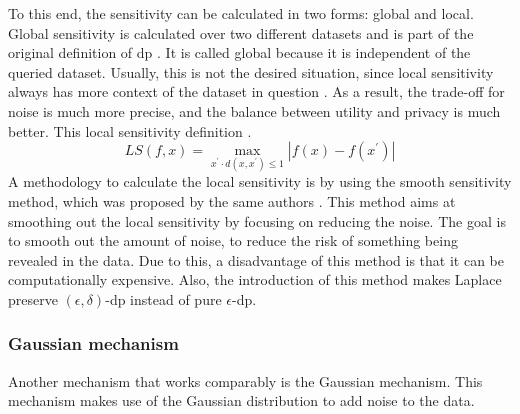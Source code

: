 To this end, the sensitivity can be calculated in two forms: global and local.
Global sensitivity is calculated over two different datasets and is part of the original definition of \gls{dp} \citep{dwork_differential_2006}.
It is called global because it is independent of the queried dataset.
Usually, this is not the desired situation, since local sensitivity always has more context of the dataset in question \citep{nissim_smooth_2007}.
As a result, the trade-off for noise is much more precise, and the balance between utility and privacy is much better.
This local sensitivity definition \citep{nissim_smooth_2007}.
\begin{equation}
  LS(f,x)=\operatorname*{max}_{x^{\prime}\cdot d(x,x^{\prime})\leq1}|f(x)-f(x^{\prime})|
  \label{local-sensitivity}
\end{equation}
A methodology to calculate the local sensitivity is by using the smooth sensitivity method, which was proposed by the same authors \citep{nissim_smooth_2007}.
This method aims at smoothing out the local sensitivity by focusing on reducing the noise.
The goal is to smooth out the amount of noise, to reduce the risk of something being revealed in the data.
Due to this, a disadvantage of this method is that it can be computationally expensive.
Also, the introduction of this method makes Laplace preserve $(\epsilon, \delta)$-\gls{dp} instead of pure $\epsilon$-\gls{dp}.

\subsubsection{Gaussian mechanism} \label{gaussian}
Another mechanism that works comparably is the Gaussian mechanism.
This mechanism makes use of the Gaussian distribution to add noise to the data.


